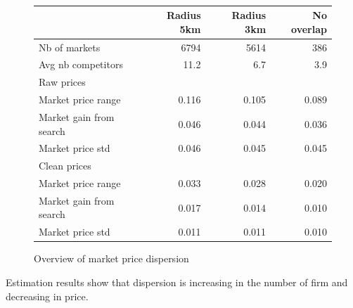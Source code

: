 \documentclass[11pt]{article}
\begin{document}
\ \\
\begin{figure}
\caption{Overview of market price dispersion}
\begin{center}
\begin{tabular}{lrrr}
\hline
{} & Radius 5km & Radius 3km & No overlap\\
\hline
Nb of markets & 6794 & 5614 & 386 \\
Avg nb competitors & 11.2 & 6.7 & 3.9 \\
\hline
Raw prices & & & \\
\hline
Market price range & 0.116 & 0.105 & 0.089\\
Market gain from search & 0.046 & 0.044 & 0.036 \\
Market price std & 0.046 & 0.045 & 0.045 \\
\hline
Clean prices & & & \\
\hline
Market price range & 0.033  & 0.028 & 0.020 \\
Market gain from search & 0.017 & 0.014 & 0.010 \\
Market price std & 0.011 & 0.011 & 0.010 \\
\hline
\end{tabular}
\end{center}
\end{figure}

Estimation results show that dispersion is increasing in the number of firm and decreasing in price.
\end{document}
